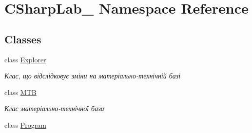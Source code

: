 \hypertarget{namespace_c_sharp_lab__1}{}\section{C\+Sharp\+Lab\+\_ Namespace Reference}
\label{namespace_c_sharp_lab__1}
\subsection*{Classes}
\begin{DoxyCompactItemize}
\item 
class \hyperlink{class_c_sharp_lab__1_1_1_explorer}{Explorer}
\begin{DoxyCompactList}\small\item\em Клас, що відслідковує зміни на матеріально-\/технічній базі \end{DoxyCompactList}\item 
class \hyperlink{class_c_sharp_lab__1_1_1_m_t_b}{M\+TB}
\begin{DoxyCompactList}\small\item\em Клас матеріально-\/технічної бази \end{DoxyCompactList}\item 
class \hyperlink{class_c_sharp_lab__1_1_1_program}{Program}
\end{DoxyCompactItemize}
